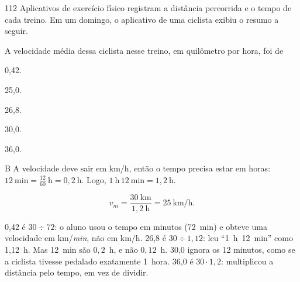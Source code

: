 \begin{questaoinedita}{1}{12}
Aplicativos de exercício físico registram a distância percorrida e o tempo de
cada treino. Em um domingo, o aplicativo de uma ciclista exibiu o resumo a seguir.

\begin{center}
\end{center}

A velocidade média dessa ciclista nesse treino, em quilômetro por hora, foi de
\begin{alternativas*}[5]
  \item 0,42.
  \item 25,0.
  \item 26,8.
  \item 30,0.
  \item 36,0.
\end{alternativas*}
\end{questaoinedita}
\begin{resolucao}{B}
 A velocidade deve sair em km/h, então o tempo precisa
estar em horas: $12~\text{min} = \frac{12}{60}~\text{h} = 0{,}2~\text{h}$. Logo,
$1~\text{h}\,12~\text{min} = 1{,}2~\text{h}$.

\[
v_m = \frac{30~\text{km}}{1{,}2~\text{h}} = 25~\text{km/h}.
\]
\begin{distratores}
 0,42 é $30 \div 72$: o aluno usou o tempo em minutos (72~min) e obteve uma
velocidade em km/\emph{min}, não em km/h.
 26,8 é $30 \div 1{,}12$: leu ``1~h~12~min'' como 1,12~h. Mas 12~min são $0{,}2$~h,
e não $0{,}12$~h.
 30,0 ignora os 12 minutos, como se a ciclista tivesse pedalado exatamente 1~hora.
 36,0 é $30 \cdot 1{,}2$: multiplicou a distância pelo tempo, em vez de dividir.
\end{distratores}
\end{resolucao}


